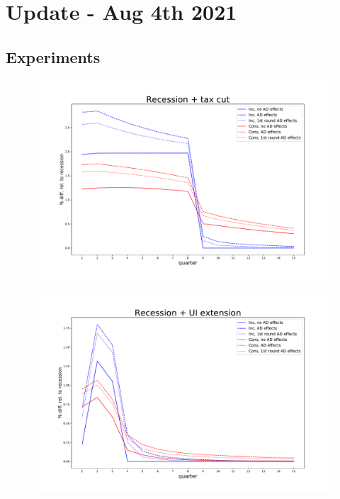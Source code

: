 \documentclass[]{article}
\begin{document}
	
\section{Update - Aug 4th 2021}
\FloatBarrier

\subsection{Experiments}


\begin{figure}
	\centering
	\includegraphics[width=\linewidth]{../FullRun_June7th/recession_taxcut_relrecession}
	\caption{}
	\label{fig:recessiontaxcutrelrecession}
\end{figure}

\begin{figure}
	\centering
	\includegraphics[width=\linewidth]{../FullRun_June7th/recession_UI_relrecession}
	\caption{}
	\label{fig:recessionuirelrecession}
\end{figure}
\end{document}
